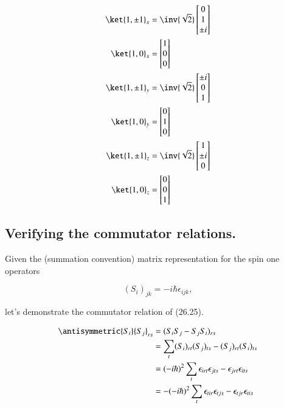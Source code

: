 \begin{align}\label{eqn:desaiCh26:30}
\ket{1,\pm 1}_x 
&=
\inv{\sqrt{2}} \begin{bmatrix}
0 \\
1 \\
\pm i
\end{bmatrix} \\
\ket{1,0}_x 
&=
\begin{bmatrix}
1 \\
0 \\
0 
\end{bmatrix} \\
\ket{1,\pm 1}_y 
&=
\inv{\sqrt{2}} \begin{bmatrix}
\pm i \\
0 \\
1 
\end{bmatrix} \\
\ket{1,0}_y 
&=
\begin{bmatrix}
0 \\
1 \\
0 
\end{bmatrix} \\
\ket{1,\pm 1}_z 
&=
\inv{\sqrt{2}} \begin{bmatrix}
1 \\
\pm i \\
0
\end{bmatrix} \\
\ket{1,0}_z 
&=
\begin{bmatrix}
0 \\
0 \\
1
\end{bmatrix} 
\end{align}

\subsection{Verifying the commutator relations.}

Given the (summation convention) matrix representation for the spin one operators

\begin{equation}\label{eqn:desaiCh26:40}
(S_i)_{jk} = - i \hbar \epsilon_{ijk},
\end{equation}

let's demonstrate the commutator relation of (26.25).

\begin{align*}
{\antisymmetric{S_i}{S_j}}_{rs} 
&=
(S_i S_j - S_j S_i)_{rs} \\
&=
\sum_t (S_i)_{rt} (S_j)_{ts} - (S_j)_{rt} (S_i)_{ts} \\
&=
(-i\hbar)^2 \sum_t \epsilon_{irt} \epsilon_{jts} - \epsilon_{jrt} \epsilon_{its} \\
&=
-(-i\hbar)^2 \sum_t \epsilon_{tir} \epsilon_{tjs} - \epsilon_{tjr} \epsilon_{tis} \\
\end{align*}

